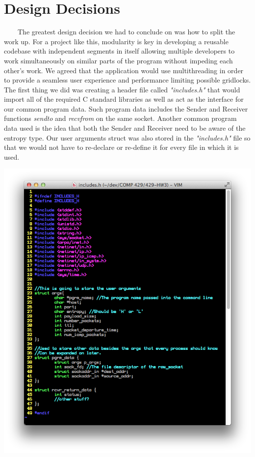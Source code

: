 \documentclass[11pt]{article}
\begin{document}
\section{Design Decisions}
\ \ \ \ The greatest design decision we had to conclude on was how to split the work up. For a project like this, modularity is key in developing a reusable codebase with independent segments in itself allowing multiple developers to work simultaneously on similar parts of the program without impeding each other's work. We agreed that the application would use multithreading in order to provide a seamless user experience and performance limiting possible gridlocks. The first thing we did was creating a header file called \textit{"includes.h"} that would import all of the required C standard libraries as well as act as the interface for our common program data. Such program data includes the Sender and Receiver functions \textit{sendto} and \textit{recvfrom} on the same socket. Another common program data used is the idea that both the Sender and Receiver need to be aware of the entropy type.  Our user arguments struct was also stored in the \textit{"includes.h"} file so that we would not have to re-declare or re-define it for every file in which it is used.
\begin{center}
\includegraphics[scale=0.4]{images/includes-header.png}
\end{center}
\end{document}
